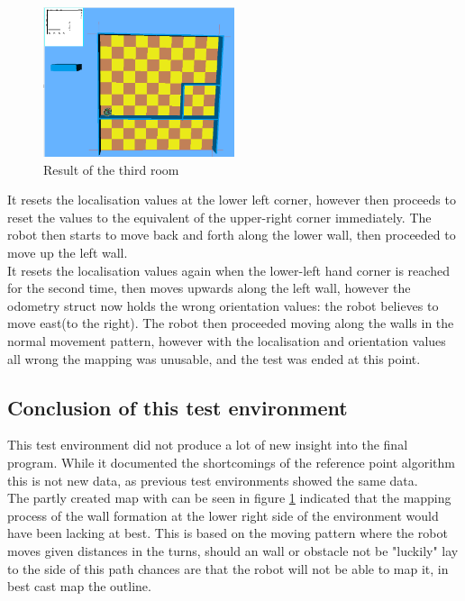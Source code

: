 \begin{figure}[h]
\centering
\includegraphics[width = 0.5\textwidth]{../../figures/map_results/room4_result1.png} 
\caption{Result of the third room}
\label{room3_result1}
\end{figure}

It resets the localisation values at the lower left corner, however then proceeds to reset the values to the equivalent of the upper-right corner immediately. The robot then starts to move back and forth along the lower wall, then proceeded to move up the left wall. \\
It resets the localisation values again when the lower-left hand corner is reached for the second time, then moves upwards along the left wall, however the odometry struct now holds the wrong orientation values: the robot believes to move east(to the right).
The robot then proceeded moving along the walls in the normal movement pattern, however with the localisation and orientation values all wrong the mapping was unusable, and the test was ended at this point. 

\subsection{Conclusion of this test environment}
This test environment did not produce a lot of new insight into the final program. While it documented the shortcomings of the reference point algorithm this is not new data, as previous test environments showed the same data. \\
The partly created map with can be seen in figure \ref{room3_result1} indicated that the mapping process of the wall formation at the lower right side of the environment would have been lacking at best. This is based on the moving pattern where the robot moves given distances in the turns, should an wall or obstacle not be "luckily" lay to the side of this path chances are that the robot will not be able to map it, in best cast map the outline. \\

